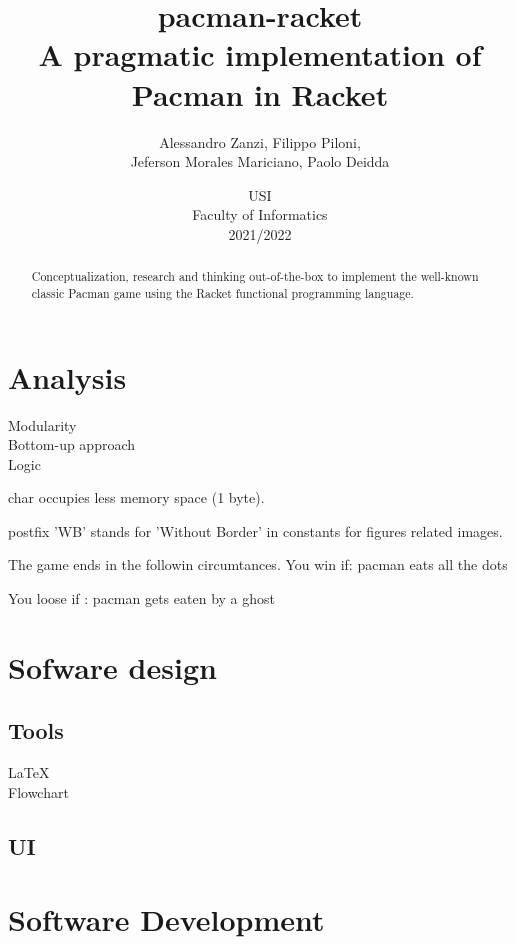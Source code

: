 \documentclass{article}
\title{
\textbf{pacman-racket} \\
A pragmatic implementation of Pacman in Racket
}
\author{
    Alessandro Zanzi,
    Filippo Piloni,\\
    Jeferson Morales Mariciano,
    Paolo Deidda
}
\date{
USI \\
Faculty of Informatics \\
[\baselineskip]  2021/2022
}
\begin{document}
\begin{titlepage}
\maketitle

\end{titlepage}
 \begin{abstract}
Conceptualization, research and thinking out-of-the-box
to implement the well-known classic Pacman game
using the Racket functional programming language.
 \end{abstract}
\clearpage
 \tableofcontents
 \clearpage
 \section{Analysis}
 Modularity\\
 
 Bottom-up approach\\
 Logic

 char occupies less memory space (1 byte).

 postfix  'WB' stands for 'Without Border' in constants for figures related images.

 The game ends in the followin circumtances.
 You win if:
 pacman eats all the dots

 You loose if :
 pacman gets eaten by a ghost


 \section{Sofware design}
 \subsection{Tools}
 \LaTeX \\
 Flowchart

 \subsection{UI}

 \section{Software Development}
\end{document}
